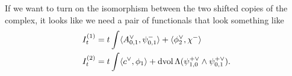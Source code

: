 \documentclass[10pt, oneside]{article}
\begin{document}
If we want to turn on the isomorphism between the two shifted copies of the complex, it looks like we need a pair of functionals that look something like
\begin{align*}
I^{(1)}_t &= t \int \langle A_{0,1}^\vee, \psi_{0,1}^- \rangle + \langle \phi_2^\vee, \chi^- \rangle \\
I^{(2)}_t &= t \int \langle c^\vee, \phi_1 \rangle + \operatorname{dvol} \Lambda (\psi_{1,0}^{+\vee} \wedge \psi_{0,1}^{+\vee}).
\end{align*}

\end{document}
